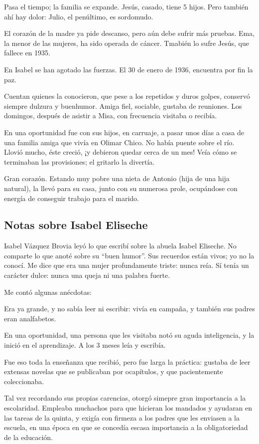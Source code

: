 \documentclass[a4paper]{article}
\begin{document}
Pasa el tiempo; la familia se expande. Jesús, casado, tiene 5 hijos. Pero también ahí hay dolor: Julio, el penúltimo, es sordomudo.

El corazón de la madre ya pide descanso, pero aún debe sufrir más pruebas. Ema, la menor de las mujeres, ha sido operada de cáncer. Tmabién lo sufre Jesús, que fallece en 1935.

En Isabel se han agotado las fuerzas. El 30 de enero de 1936, encuentra por fin la paz.

Cuentan quienes la conocieron, que pese a los repetidos y duros golpes, conservó siempre dulzura y buenhumor. Amiga fiel, sociable, gustaba de reuniones. Los domingos, después de asistir a Misa, con frecuencia visitaba o recibía.

En una oportunidad fue con sus hijos, en carruaje, a pasar unos días a casa de una familia amiga que vivía en Olimar Chico. No había puente sobre el río. Llovió mucho, éste creció, ¡y debieron quedar cerca de un mes! Veía cómo se terminaban las provisiones; el gritarlo la divertía.

Gran corazón. Estando muy pobre una nieta de Antonio (hija de una hija natural), la llevó para su casa, junto con su numerosa prole, ocupándose con energía de conseguir trabajo para el marido.

\subsection{Notas sobre Isabel Eliseche}

Isabel Vázquez Brovia leyó lo que escribí sobre la abuela Isabel Eliseche. No comparte lo que anoté sobre su ``buen humor''. Sus recuerdos están vivos; yo no la conocí. Me dice que era una mujer profundamente triste: nunca reía. Sí tenía un carácter dulce: nunca una queja ni una palabra fuerte.

Me contó algunas anécdotas:

\bigbreak{}

Era ya grande, y no sabía leer ni escribir: vivía en campaña, y también sus padres eran analfabetos.

En una oportunidad, una persona que les visitaba notó su aguda inteligencia, y la inició en el aprendizaje. A los 3 meses leía y escribía.

Fue eso toda la enseñanza que recibió, pero fue larga la práctica: gustaba de leer extensas novelas que se publicaban por ocapítulos, y que pacientemente coleccionaba.

Tal vez recordando sus propias carencias, otorgó simepre gran importancia a la escolaridad. Empleaba muchachos para que hicieran los mandados y ayudaran en las tareas de la quinta, y exigía con firmeza a los padres que les enviasen a la escuela, en una época en que se concedía escasa importancia a la obligatoriedad de la educación.
\end{document}
